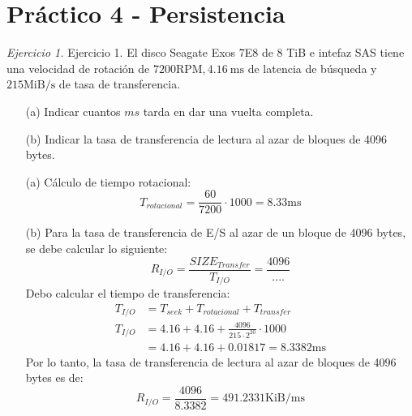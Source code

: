\documentclass[12pt]{article}
\begin{document}
\section*{Práctico 4 - Persistencia}

\noindent \textit{Ejercicio 1.} Ejercicio 1. El disco Seagate Exos 7E8 de 8 TiB e intefaz SAS tiene una velocidad de rotación de $7200 \mathrm{RPM}, 4.16 \mathrm{~ms}$ de latencia de búsqueda y $215 \mathrm{MiB} / \mathrm{s}$ de tasa de transferencia.

\begin{itemize}
    \item[(a)] Indicar cuantos $m s$ tarda en dar una vuelta completa.
    \item[(b)] Indicar la tasa de transferencia de lectura al azar de bloques de 4096 bytes.
\end{itemize}

\begin{rta}
    \begin{itemize}
        \item[(a)] Cálculo de tiempo rotacional:
        \begin{equation*}
            T_{rotacional} = \frac{60}{7200} \cdot 1000 = 8.33 \mathrm{ms}
        \end{equation*}
        \item[(b)] Para la tasa de transferencia de E/S al azar de un bloque de 4096 bytes, se debe calcular lo siguiente:
        \begin{equation*}
            R_{I/O} = \frac{SIZE_{Transfer}}{T_{I/O}} = \frac{4096}{....}
        \end{equation*}
        Debo calcular el tiempo de transferencia:
        \begin{align*}
            T_{I/O} &= T_{seek} + T_{rotacional} + T_{transfer} \\
            T_{I/O} &= 4.16 + 4.16 + \frac{4096}{215 \cdot 2^{20}} \cdot 1000 \\
            &= 4.16 + 4.16 + 0.01817 = 8.3382 \mathrm{ms}
        \end{align*}
        Por lo tanto, la tasa de transferencia de lectura al azar de bloques de 4096 bytes es de:
        \begin{equation*}
            R_{I/O} = \frac{4096}{8.3382} = 491.2331 \mathrm{KiB/ms}
        \end{equation*}
    \end{itemize}
\end{rta}
\end{document}

